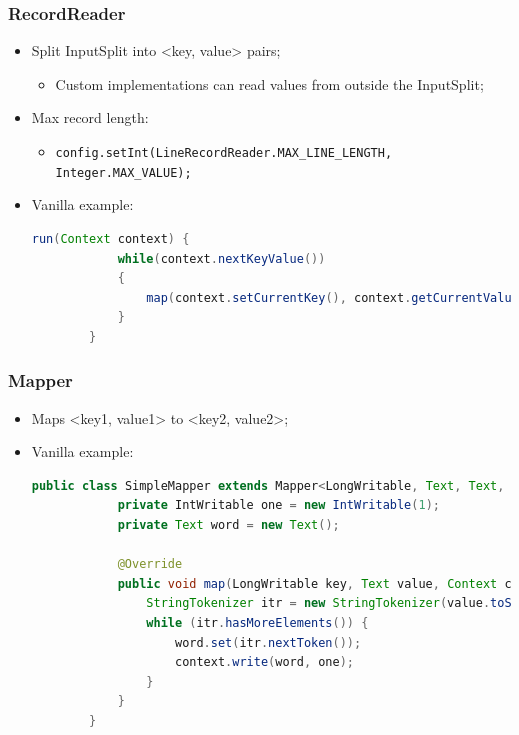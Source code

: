 \documentclass[aspectratio=169]{beamer}
\begin{document}
\begin{frame}[fragile]
	\frametitle{RecordReader}

	\begin{itemize}
		\item Split InputSplit into <key, value> pairs;
		      \begin{itemize}
			      \item Custom implementations can read values from outside the InputSplit;
		      \end{itemize}
		\item Max record length:
		      \begin{itemize}
			      \item {\scriptsize \texttt{config.setInt(LineRecordReader.MAX\_LINE\_LENGTH, Integer.MAX\_VALUE);}}
		      \end{itemize}
		\item Vanilla example:
		      \begin{lstlisting}[language=java,basicstyle=\tiny,columns=fullflexible]
        run(Context context) {
            while(context.nextKeyValue())
            {
                map(context.setCurrentKey(), context.getCurrentValue(), context)
            }
        }
            \end{lstlisting}
	\end{itemize}
\end{frame}

\begin{frame}[fragile]
	\frametitle{Mapper}

	\begin{itemize}
		\item Maps <key1, value1> to <key2, value2>;
		\item Vanilla example:
		      \begin{lstlisting}[language=java,basicstyle=\tiny,columns=fullflexible]
        public class SimpleMapper extends Mapper<LongWritable, Text, Text, IntWritable> {
            private IntWritable one = new IntWritable(1);
            private Text word = new Text();

            @Override
            public void map(LongWritable key, Text value, Context context) {
                StringTokenizer itr = new StringTokenizer(value.toString());
                while (itr.hasMoreElements()) {
                    word.set(itr.nextToken());
                    context.write(word, one);
                }
            }
        }
            \end{lstlisting}
	\end{itemize}
\end{frame}
\end{document}
